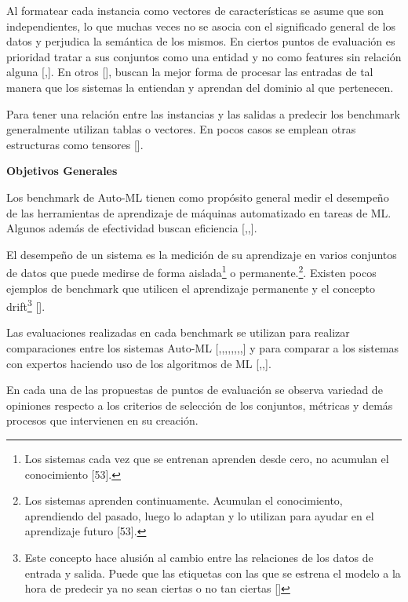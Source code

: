 Al formatear cada instancia como vectores de características se asume que son independientes, lo que muchas veces no se asocia con el significado general de los datos y 
perjudica la semántica de los mismos. En ciertos puntos de evaluación es prioridad tratar a sus conjuntos como una entidad y no como features sin relación 
alguna [\cite{23},\cite{29}]. En otros [\cite{27}], buscan la mejor forma de procesar las entradas de tal manera que los sistemas la entiendan y aprendan del 
dominio al que pertenecen.

Para tener una relación entre las instancias y las salidas a predecir los benchmark generalmente utilizan tablas o vectores. En pocos casos se emplean otras estructuras 
como tensores [\cite{29}].

\begin{flushleft} 
    {\large { \textbf{Objetivos Generales}}}\label{subsection:obj Auto-ML}
\end{flushleft}
Los benchmark de Auto-ML tienen como propósito general medir el desempeño de las 
herramientas de aprendizaje de máquinas automatizado en tareas de ML. Algunos además de efectividad buscan eficiencia [\cite{11},\cite{12},\cite{29}].

El desempeño de un sistema es la medición de su aprendizaje en varios conjuntos de datos que puede medirse de forma aislada\footnote{Los sistemas cada vez 
que se entrenan aprenden desde cero, no acumulan el conocimiento [53].} o permanente.\footnote{Los sistemas aprenden continuamente. Acumulan el conocimiento, 
aprendiendo del pasado, luego lo adaptan y lo utilizan para ayudar en el aprendizaje futuro [53].}. Existen pocos ejemplos de benchmark que utilicen el aprendizaje 
permanente y el concepto drift\footnote{Este concepto hace alusión al cambio entre las relaciones de los datos de entrada y salida. Puede que las etiquetas con las que 
se estrena el modelo a la hora de predecir ya no sean ciertas o no tan ciertas [\cite{54}] } [\cite{12}].

Las evaluaciones realizadas en cada benchmark se utilizan para realizar comparaciones entre los sistemas Auto-ML
[\cite{10},\cite{14},\cite{15},\cite{17},\cite{18},\cite{23},\cite{24},\cite{31},\cite{32}] y para comparar a los sistemas con expertos haciendo uso de los algoritmos de ML 
[\cite{19},\cite{20},\cite{21}].

En cada una de las propuestas de puntos de evaluación se observa variedad de opiniones respecto a los criterios de selección de los conjuntos, métricas y demás 
procesos que intervienen en su creación.

